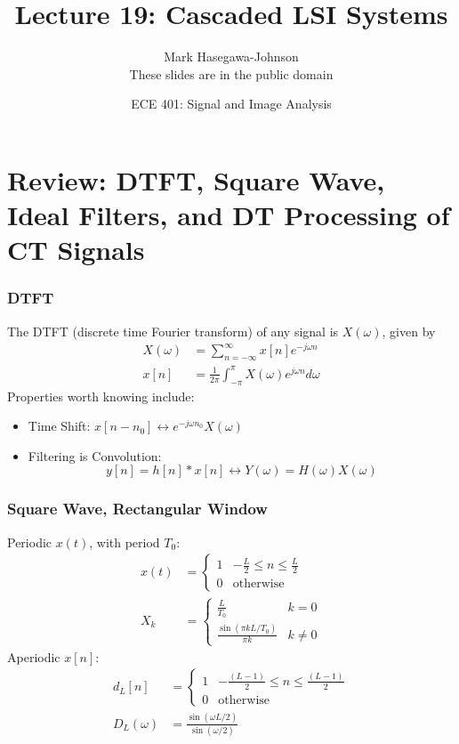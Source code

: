 \documentclass{beamer}
\title{Lecture 19: Cascaded LSI Systems}
\author{Mark Hasegawa-Johnson\\These slides are in the public domain}
\date{ECE 401: Signal and Image Analysis}
\begin{document}
\begin{frame}
  \maketitle
\end{frame}

\begin{frame}
  \tableofcontents
\end{frame}

\section[Review]{Review: DTFT, Square Wave, Ideal Filters, and DT Processing of CT Signals}
\setcounter{subsection}{1}

\begin{frame}
  \frametitle{DTFT}

  The DTFT (discrete time Fourier transform) of any signal is
  $X(\omega)$, given by
  \begin{align*}
    X(\omega) &= \sum_{n=-\infty}^\infty x[n]e^{-j\omega n}\\
    x[n] &= \frac{1}{2\pi}\int_{-\pi}^\pi X(\omega)e^{j\omega n}d\omega
  \end{align*}
  Properties worth knowing  include:
  \begin{itemize}
  \item Time Shift: $x[n-n_0]\leftrightarrow e^{-j\omega n_0}X(\omega)$
  \item Filtering is Convolution:
    \[
    y[n]=h[n]\ast x[n]\leftrightarrow Y(\omega)=H(\omega)X(\omega)
    \]
  \end{itemize}
\end{frame}

\begin{frame}
  \frametitle{Square Wave, Rectangular Window}

  Periodic $x(t)$, with period $T_0$:
  \begin{align*}
    x(t) &= \begin{cases}1&-\frac{L}{2}\le n\le\frac{L}{2}\\
      0&\text{otherwise}
    \end{cases}\\
    X_k&= \begin{cases}
      \frac{L}{T_0} & k=0\\
      \frac{\sin(\pi kL/T_0)}{\pi k} & k\ne 0
    \end{cases}
  \end{align*}
  Aperiodic $x[n]$:
  \begin{align*}
    d_L[n] &= \begin{cases}1&-\frac{(L-1)}{2}\le n\le\frac{(L-1)}{2}\\
      0&\text{otherwise}
    \end{cases}\\
    D_L(\omega)&= \frac{\sin(\omega L/2)}{\sin(\omega/2)}
  \end{align*}
\end{frame}
\end{document}
